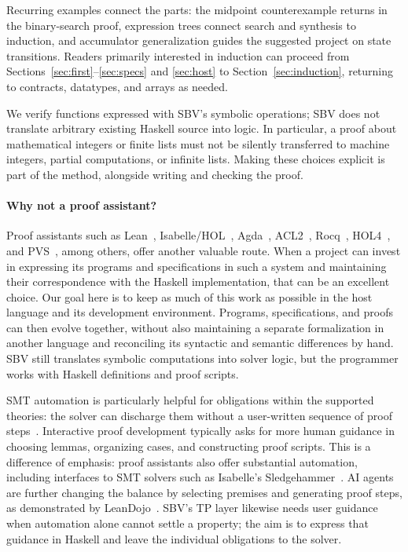 \documentclass[review]{jfp-epi}
\begin{document}
Recurring examples connect the parts: the midpoint counterexample returns in the
binary-search proof, expression trees connect search and synthesis to induction,
and accumulator generalization guides the suggested project on state transitions.
Readers primarily interested in induction can proceed from
Sections~\ref{sec:first}--\ref{sec:specs} and \ref{sec:host} to
Section~\ref{sec:induction}, returning to contracts, datatypes, and arrays as needed.

We verify functions expressed with SBV's symbolic operations; SBV does not
translate arbitrary existing Haskell source into logic. In particular, a proof
about mathematical integers or finite lists must not be silently transferred to
machine integers, partial computations, or infinite lists. Making these choices
explicit is part of the method, alongside writing and checking the proof.

\paragraph{Why not a proof assistant?}
Proof assistants such as Lean~\citep{lean4}, Isabelle/HOL~\citep{isabelle},
Agda~\citep{agda}, ACL2~\citep{acl2}, Rocq~\citep{rocq},
HOL4~\citep{hol4}, and PVS~\citep{pvs}, among others, offer another valuable
route. When a project can invest in expressing its programs and
specifications in such a system and maintaining their correspondence with the
Haskell implementation, that can be an excellent choice. Our goal here is to
keep as much of this work as possible in the host language and its development
environment. Programs, specifications, and proofs can then evolve together,
without also maintaining a separate formalization in another language and
reconciling its syntactic and semantic differences by hand. SBV still translates
symbolic computations into solver logic, but the programmer works with Haskell
definitions and proof scripts.

SMT automation is particularly helpful for obligations within the supported
theories: the solver can discharge them without a user-written sequence of
proof steps~\citep{z3,cvc5}. Interactive proof development typically asks for
more human guidance in choosing lemmas, organizing cases, and constructing
proof scripts. This is a difference of emphasis: proof assistants also offer
substantial automation, including interfaces to SMT solvers such as Isabelle's
Sledgehammer~\citep{sledgehammer}. AI agents are further changing the balance
by selecting premises and generating proof steps, as demonstrated by
LeanDojo~\citep{leandojo}. SBV's TP layer likewise needs user guidance when
automation alone cannot settle a property; the aim is to express that guidance
in Haskell and leave the individual obligations to the solver.
\end{document}
